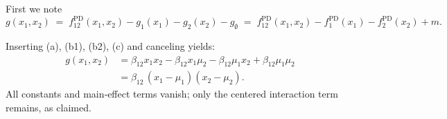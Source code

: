 {\begin{enumerate}
    First we note
    $$
    g(x_1,x_2)
    \;=\; f_{12}^{\mathrm{PD}}(x_1,x_2)
        - g_{1}(x_1)
        - g_{2}(x_2)
        - g_\emptyset
    \;=\; f_{12}^{\mathrm{PD}}(x_1,x_2)
       -f_{1}^{\mathrm{PD}}(x_1)
       -f_{2}^{\mathrm{PD}}(x_2)
       +m.
    $$
    
    
    Inserting (a), (b1), (b2), (c) and canceling yields:
    \[
    \begin{aligned}
        g(x_1,x_2)
        & = \beta_{12} x_1 x_2 - \beta_{12} x_1 \mu_2 - \beta_{12} \mu_1 x_2 + \beta_{12} \mu_1 \mu_2 \\
        & = \boxed{\beta_{12}\,(x_1-\mu_1)(x_2-\mu_2)}.
    \end{aligned}
    \]
    All constants and main‐effect terms vanish; only the centered interaction term remains, as claimed.
\end{enumerate}
}